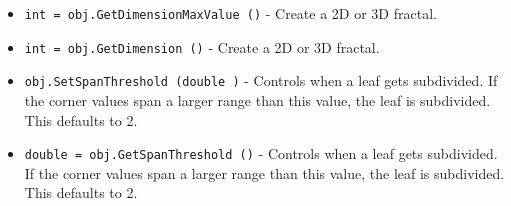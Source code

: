 \begin{itemize}
\item  \verb|int = obj.GetDimensionMaxValue ()| -  Create a 2D or 3D fractal.

\item  \verb|int = obj.GetDimension ()| -  Create a 2D or 3D fractal.

\item  \verb|obj.SetSpanThreshold (double )| -  Controls when a leaf gets subdivided.  If the corner values span 
 a larger range than this value, the leaf is subdivided.  This
 defaults to 2.

\item  \verb|double = obj.GetSpanThreshold ()| -  Controls when a leaf gets subdivided.  If the corner values span 
 a larger range than this value, the leaf is subdivided.  This
 defaults to 2.

\end{itemize}
